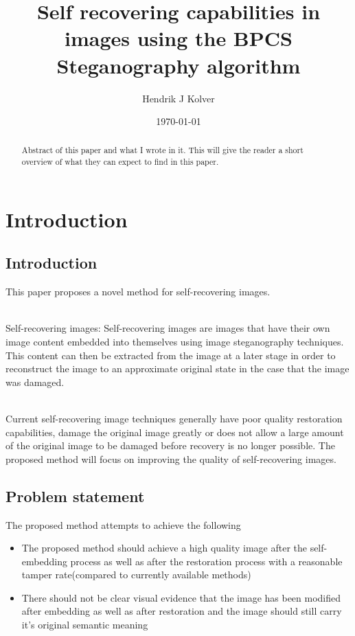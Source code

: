 \documentclass[12pt]{article}
\title{Self recovering capabilities in images using the BPCS Steganography algorithm}
\author{Hendrik J Kolver}
\date{\today}
\begin{document}
\maketitle

\begin{abstract}

\noindent Abstract of this paper and what I wrote in it.
This will give the reader a short overview of what they can expect to find in this paper.

\end{abstract}

\tableofcontents
\section{Introduction}

\subsection{Introduction}
This paper proposes a novel method for self-recovering images.

\hspace{0pt} \\
Self-recovering images: Self-recovering images are images that have their own image content embedded into themselves using image steganography techniques. 
This content can then be extracted from the image at a later stage in order to reconstruct the image to an approximate original state in the case that the image was damaged.

\hspace{0pt} \\
Current self-recovering image techniques generally have poor quality restoration capabilities, damage the original image greatly or does not allow a large amount of the original image to be damaged before recovery is no longer possible.
The proposed method will focus on improving the quality of self-recovering images.

\subsection{Problem statement}
The proposed method attempts to achieve the following
\begin{itemize}
	\item The proposed method should achieve a high quality image after the self-embedding process as well as after the restoration process with a reasonable tamper rate(compared to currently available methods)
	\item There should not be clear visual evidence that the image has been modified after embedding as well as after restoration and the image should still carry it's original semantic meaning
\end{itemize}
\end{document}
